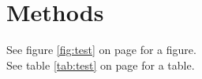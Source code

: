 \section{Methods}\label{methods}
See figure \ref{fig:test} on page \pageref{fig:test} for a figure.\\
See table \ref{tab:test} on page \pageref{tab:test} for a table.